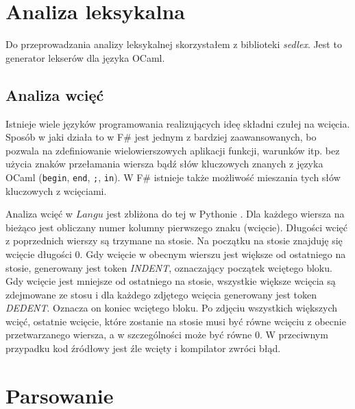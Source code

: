 \documentclass[declaration,shortabstract]{iithesis}
\begin{document}


\section{Analiza leksykalna}

Do przeprowadzania analizy leksykalnej skorzystałem z biblioteki 
\textit{sedlex}. Jest to generator lekserów dla języka OCaml.

\subsection{Analiza wcięć} \label{wciecia_omowienie}
 
Istnieje wiele języków programowania realizujących ideę składni czułej na 
wcięcia. Sposób w jaki działa to w F\# jest jednym z bardziej zaawansowanych,
bo pozwala na zdefiniowanie wielowierszowych aplikacji funkcji, warunków itp. 
bez użycia znaków przełamania wiersza bądź słów kluczowych znanych 
z języka OCaml (\texttt{begin}, \texttt{end}, \texttt{;}, \texttt{in}).
 W F\# 
istnieje 
także możliwość mieszania tych słów kluczowych z wcięciami. 

Analiza wcięć w $Langu$ jest zbliżona do tej w Pythonie
\cite{python_indentation}. Dla każdego wiersza
na bieżąco jest obliczany numer kolumny pierwszego znaku (wcięcie). Długości 
wcięć z poprzednich wierszy są trzymane na stosie. Na początku na stosie
znajduję się wcięcie długości $0$. Gdy wcięcie w obecnym wierszu jest większe od 
ostatniego na stosie, generowany jest token \textit{INDENT}, oznaczający 
początek wciętego bloku. Gdy wcięcie jest mniejsze od ostatniego na stosie, 
wszystkie większe wcięcia są zdejmowane ze stosu i dla każdego zdjętego wcięcia 
generowany jest token \textit{DEDENT}. Oznacza on koniec wciętego bloku. 
Po zdjęciu 
wszystkich większych wcięć, ostatnie wcięcie, które zostanie na stosie musi być 
równe wcięciu z obecnie przetwarzanego wiersza, a w szczególności może być równe $0$. 
W przeciwnym 
przypadku kod źródłowy jest źle wcięty i kompilator zwróci błąd.

\section{Parsowanie}
\end{document}
